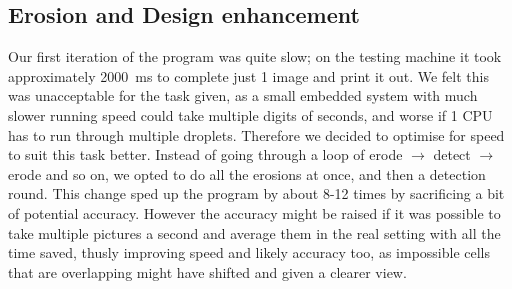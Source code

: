 \documentclass[a4paper, english]{article}
\numberwithin{equation}{section}
\begin{document}
\subsection{Erosion and Design enhancement}\label{sec:erosion}
Our first iteration of the program was quite slow; on the testing machine it took approximately \SI{2000}{\milli\second} to complete just 1 image and print it out. We felt this was unacceptable for the task given, as a small embedded system with much slower running speed could take multiple digits of seconds, and worse if 1 CPU has to run through multiple droplets. Therefore we decided to optimise for speed to suit this task better. Instead of going through a loop of erode \(\rightarrow\) detect \(\rightarrow\) erode and so on, we opted to do all the erosions at once, and then a detection round. This change sped up the program by about 8-12 times by sacrificing a bit of potential accuracy. However the accuracy might be raised if it was possible to take multiple pictures a second and average them in the real setting with all the time saved, thusly improving speed and likely accuracy too, as impossible cells that are overlapping might have shifted and given a clearer view.
\end{document}
